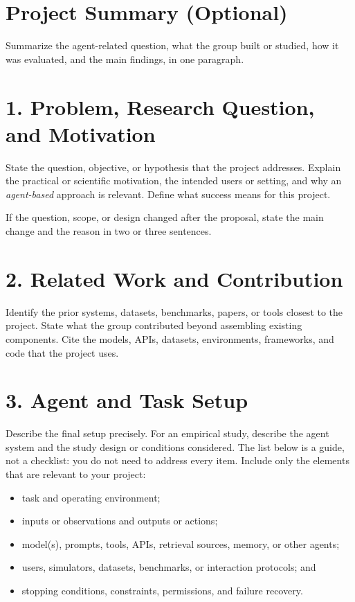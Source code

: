 \documentclass[11pt]{article}
\begin{document}
\section*{Project Summary (Optional)}

Summarize the agent-related question, what the group built or studied, how it was
evaluated, and the main findings, in one paragraph.

\section*{1. Problem, Research Question, and Motivation}

State the question, objective, or hypothesis that the project addresses. Explain the
practical or scientific motivation, the intended users or setting, and why an
\emph{agent-based} approach is relevant. Define what success means for this project.

If the question, scope, or design changed after the proposal, state the main change
and the reason in two or three sentences.

\section*{2. Related Work and Contribution}

Identify the prior systems, datasets, benchmarks, papers, or tools closest to the
project. State what the group contributed beyond assembling existing components.
Cite the models, APIs, datasets, environments, frameworks, and code that the project
uses.

\section*{3. Agent and Task Setup}

Describe the final setup precisely. For an empirical study, describe the agent
system and the study design or conditions considered. The list below is a guide,
not a checklist: you do not need to address every item. Include only the elements
that are relevant to your project:

\begin{itemize}[leftmargin=*,itemsep=0.25em]
    \item task and operating environment;
    \item inputs or observations and outputs or actions;
    \item model(s), prompts, tools, APIs, retrieval sources, memory, or other agents;
    \item users, simulators, datasets, benchmarks, or interaction protocols; and
    \item stopping conditions, constraints, permissions, and failure recovery.
\end{itemize}
\end{document}
